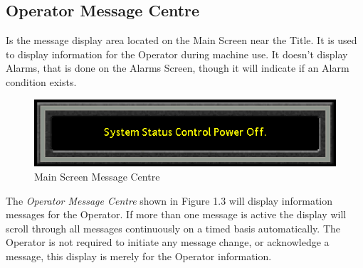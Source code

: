 \subsection{Operator Message Centre}
Is the message display area located on the Main Screen near the Title. It is used to display information for the Operator during machine use. It doesn't display Alarms, that is done on the Alarms Screen, though it will indicate if an Alarm condition exists.
\begin{figure}
	\centering
	\includegraphics[width=.5\linewidth]{screen-captures/message-centre}
	\caption{Main Screen Message Centre}
	\label{fig:main-msg-cntr}
\end{figure}
The \textit{Operator Message Centre} shown in Figure 1.3 will display information messages for the Operator. If more than one message is active the display will scroll through all messages continuously on a timed basis automatically. The Operator is not required to initiate any message change, or acknowledge a message, this display is merely for the Operator information.
\\
\\
\\
\\
\\
\\
\\
\\
\\
\\
\\
\\
\\
\\
\\
\pagebreak
